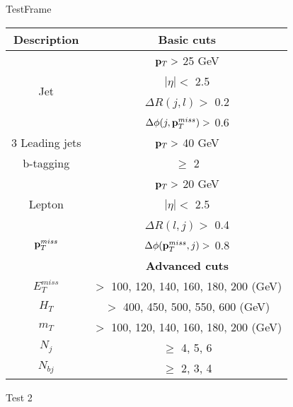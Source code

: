 \documentclass{beamer}
\begin{document}
\begin{frame}{TestFrame}

    \centering
      \begin{tabular}{|c|c|} \hline
        Description & Basic cuts  \\ \hline
       \multirow{4}{*}{Jet} &${\bf p}_T >$ 25 GeV   \\
           &$|\eta| < $ 2.5   \\
           &$\Delta R(j,l) >$ 0.2  \\
           &$\Delta \phi(j,{\bf p}_T^{miss}) >$ 0.6  \\ \hline
        3 Leading jets & ${\bf p}_T >$ 40 GeV   \\ \hline
        b-tagging & $\ge$ 2 \\ \hline
        \multirow{3}{*}{Lepton} & ${\bf p}_T >$ 20 GeV \\
               & $|\eta| <$ 2.5 \\
               & $\Delta R(l,j) >$ 0.4 \\ \hline
        {${\bf p}_T^{miss}$} & $\Delta \phi({\bf p}_T^{miss},j) >$ 0.8 \\ \hline
        & {\bf Advanced cuts} \\ \hline
        $E_T^{miss}$ & $>$ 100, 120, 140, 160, 180, 200 (GeV)\\ \hline
        $H_T$ & $>$ 400, 450, 500, 550, 600 (GeV)\\ \hline
        $m_T$ & $>$ 100, 120, 140, 160, 180, 200 (GeV)\\ \hline
        $N_j$ & $\ge$ 4, 5, 6 \\ \hline
        $N_{bj}$ & $\ge$ 2, 3, 4 \\ \hline
      \end{tabular}

\end{frame}

\begin{frame}{Test 2}

\end{frame}
\end{document}
